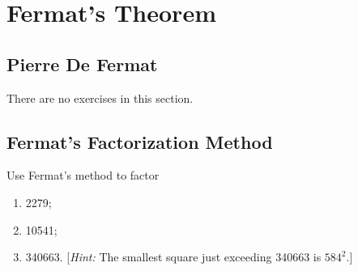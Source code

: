 \chapter{Fermat's Theorem}

\section{Pierre De Fermat}

There are no exercises in this section.

\section{Fermat's Factorization Method}

\begin{exercise}
    Use Fermat's method to factor
    \begin{enumerate}
        \item 2279;
        \item 10541;
        \item 340663. [\textit{Hint:} The smallest square just exceeding 340663 is $584^2$.]
    \end{enumerate}
\end{exercise}

